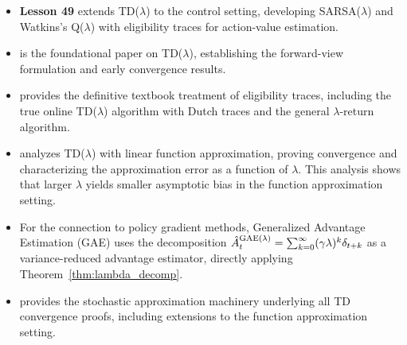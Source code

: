 \documentclass[11pt,a4paper]{article}
\begin{document}
\begin{itemize}
  \item \textbf{Lesson 49} extends TD($\lambda$) to the control
    setting, developing SARSA($\lambda$) and Watkins's Q($\lambda$)
    with eligibility traces for action-value estimation.

  \item \citet{sutton1988} is the foundational paper on TD($\lambda$),
    establishing the forward-view formulation and early convergence
    results.

  \item \citet[Chapter 12]{suttonbarto2018} provides the definitive
    textbook treatment of eligibility traces, including the true online
    TD($\lambda$) algorithm with Dutch traces and the general
    $\lambda$-return algorithm.

  \item \citet{tsitsiklis1997} analyzes TD($\lambda$) with linear
    function approximation, proving convergence and characterizing the
    approximation error as a function of $\lambda$. This analysis
    shows that larger $\lambda$ yields smaller asymptotic bias in the
    function approximation setting.

  \item For the connection to policy gradient methods,
    Generalized Advantage Estimation (GAE) uses the decomposition
    $\hat{A}_t^{\text{GAE}(\lambda)} = \sum_{k=0}^\infty
    (\gamma\lambda)^k \delta_{t+k}$ as a variance-reduced
    advantage estimator, directly applying
    Theorem~\ref{thm:lambda_decomp}.

  \item \citet{borkar2008} provides the stochastic approximation
    machinery underlying all TD convergence proofs, including
    extensions to the function approximation setting.
\end{itemize}


\end{document}
